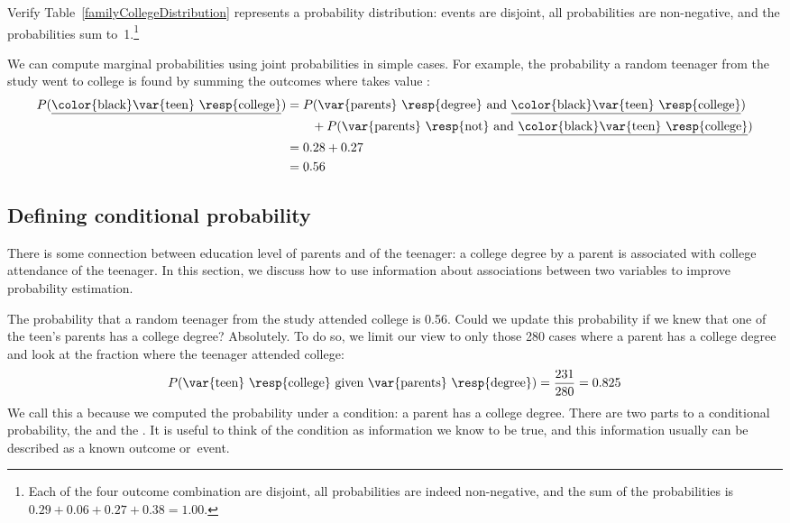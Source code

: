 \begin{exercise}
Verify Table~\ref{familyCollegeDistribution} represents a probability distribution: events are disjoint, all probabilities are non-negative, and the probabilities sum to~1.\footnote{Each of the four outcome combination are disjoint, all probabilities are indeed non-negative, and the sum of the probabilities is $0.29 + 0.06 + 0.27 + 0.38 = 1.00$.}
\end{exercise}

We can compute marginal probabilities using joint probabilities in simple cases. For example, the probability a random teenager from the study went to college is found by summing the outcomes where  takes value :
\begin{align*}
P(\text{\underline{\color{black}\var{teen} \resp{college}}})
&=  P(\text{\var{parents} \resp{degree} and \underline{\color{black}\var{teen} \resp{college}}}) \\
& \quad \quad + P(\text{\var{parents} \resp{not} and \underline{\color{black}\var{teen} \resp{college}}}) \\
&= 0.28 + 0.27 \\
&= 0.56
\end{align*}


\subsection{Defining conditional probability}


There is some connection between education level of parents and of the teenager: a college degree by a parent is associated with college attendance of the teenager. In this section, we discuss how to use information about associations between two variables to improve probability estimation.

The probability that a random teenager from the study attended college is 0.56. Could we update this probability if we knew that one of the teen's parents has a college degree? Absolutely. To do so, we limit our view to only those 280 cases where a parent has a college degree and look at the fraction where the teenager attended college:
\begin{eqnarray*}
P(\text{\var{teen} \resp{college} given \var{parents} \resp{degree}}) = \frac{231}{280} = 0.825
\end{eqnarray*}
We call this a  because we computed the probability under a condition: a parent has a college degree. There are two parts to a conditional probability, the  and the . It is useful to think of the condition as information we know to be true, and this information usually can be described as a known outcome or~event.

